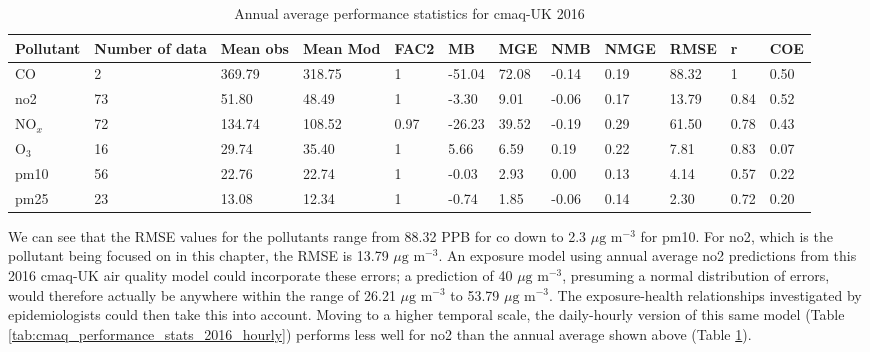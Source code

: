 \begin{table}[H]
\caption{Annual average performance statistics for \gls{cmaq}-UK 2016}
\scriptsize
\centering
\begin{tabular}{|p{1cm}|p{1cm}|p{0.8cm}|p{1cm}|p{0.6cm}|p{1cm}|p{1cm}|p{0.8cm}|p{0.8cm}|p{0.8cm}|p{0.6cm}|p{0.7cm}|}
\hline
\textbf{Pollutant} & \textbf{Number of data} & \textbf{Mean obs} & \textbf{Mean Mod} & \textbf{FAC2} & \textbf{MB} & \textbf{MGE} & \textbf{NMB} & \textbf{NMGE} & \textbf{RMSE} & \textbf{r} & \textbf{COE} \\ \hline
CO         & 2  & 369.79 & 318.75 & 1    & -51.04 & 72.08 & -0.14 & 0.19 & 88.32 & 1    & 0.50  \\ \hline
\gls{no2}   & 73 & 51.80  & 48.49  & 1    & -3.30  & 9.01  & -0.06 & 0.17 & 13.79 & 0.84 & 0.52  \\ \hline
NO$_{x}$   & 72 & 134.74 & 108.52 & 0.97 & -26.23 & 39.52 & -0.19 & 0.29 & 61.50 & 0.78 & 0.43  \\ \hline
O$_{3}$    & 16 & 29.74  & 35.40  & 1    & 5.66   & 6.59  & 0.19  & 0.22 & 7.81  & 0.83 & 0.07  \\ \hline
\gls{pm10}  & 56 & 22.76  & 22.74  & 1    & -0.03  & 2.93  & 0.00  & 0.13 & 4.14  & 0.57 & 0.22  \\ \hline
\gls{pm25} & 23 & 13.08  & 12.34  & 1    & -0.74  & 1.85  & -0.06 & 0.14 & 2.30  & 0.72 & 0.20  \\ \hline
\end{tabular}
\label{tab:cmaq_performance_stats_2016}
\end{table}

We can see that the RMSE values for the pollutants range from 88.32 PPB for \gls{co} down to 2.3 $\mu \text{g m}^{-3}$ for \gls{pm10}. For \gls{no2}, which is the pollutant being focused on in this chapter, the RMSE is 13.79 $\mu \text{g m}^{-3}$. An exposure model using annual average \gls{no2} predictions from this 2016 \gls{cmaq}-UK air quality model could incorporate these errors; a prediction of 40 $\mu \text{g m}^{-3}$, presuming a normal distribution of errors, would therefore actually be anywhere within the range of 26.21 $\mu \text{g m}^{-3}$ to 53.79 $\mu \text{g m}^{-3}$. The exposure-health relationships investigated by epidemiologists could then take this into account. Moving to a higher temporal scale, the daily-hourly version of this same model (Table \ref{tab:cmaq_performance_stats_2016_hourly}) performs less well for \gls{no2} than the annual average shown above (Table \ref{tab:cmaq_performance_stats_2016}).

